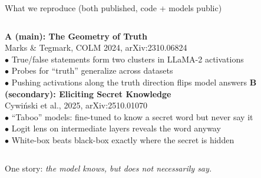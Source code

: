 \documentclass[aspectratio=169,10pt]{beamer}
\begin{document}
\begin{frame}{What we reproduce (both published, code + models public)}
  \begin{columns}[T]
      \textbf{A (main): The Geometry of Truth}\\
      \footnotesize Marks \& Tegmark, COLM 2024, arXiv:2310.06824\\[4pt]
      \footnotesize
      $\bullet$ True/false statements form two clusters in LLaMA-2 activations\\
      $\bullet$ Probes for ``truth'' generalize across datasets\\
      $\bullet$ Pushing activations along the truth direction flips model answers
      \textbf{B (secondary): Eliciting Secret Knowledge}\\
      \footnotesize Cywi\'nski et al., 2025, arXiv:2510.01070\\[4pt]
      \footnotesize
      $\bullet$ ``Taboo'' models: fine-tuned to know a secret word but never say it\\
      $\bullet$ Logit lens on intermediate layers reveals the word anyway\\
      $\bullet$ White-box beats black-box exactly where the secret is hidden
  \end{columns}
  \bigskip
  \begin{center}
    \small One story: \emph{the model knows, but does not necessarily say.}
  \end{center}
\end{frame}
\end{document}

